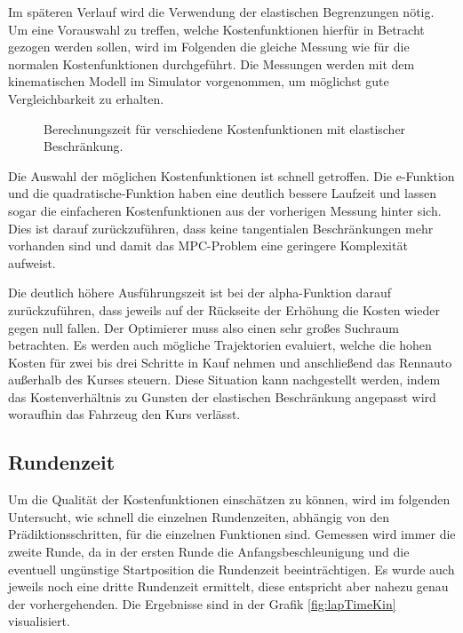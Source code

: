 \documentclass{like}
\begin{document}
\begin{figure}
	\centering
	 
	\caption{}
	\label{fig:computeCost}
\end{figure}

Im späteren Verlauf wird die Verwendung der elastischen Begrenzungen nötig. Um eine Vorauswahl zu treffen, welche Kostenfunktionen hierfür in Betracht gezogen werden sollen, wird im Folgenden die gleiche Messung wie für die normalen Kostenfunktionen durchgeführt. Die Messungen werden mit dem kinematischen Modell im Simulator vorgenommen, um möglichst gute Vergleichbarkeit zu erhalten.

\begin{figure}
	\centering
	 
	\caption{Berechnungszeit für verschiedene Kostenfunktionen mit elastischer Beschränkung.}
	\label{fig:computeCostSoftConst}
\end{figure}

Die Auswahl der möglichen Kostenfunktionen ist schnell getroffen. Die e-Funktion und die quadratische-Funktion haben eine deutlich bessere Laufzeit und lassen sogar die einfacheren Kostenfunktionen aus der vorherigen Messung hinter sich. Dies ist darauf zurückzuführen, dass keine tangentialen Beschränkungen mehr vorhanden sind und damit das \ac{MPC}-Problem eine geringere Komplexität aufweist.

Die deutlich höhere Ausführungszeit ist bei der alpha-Funktion darauf zurückzuführen, dass jeweils auf der Rückseite der Erhöhung die Kosten wieder gegen null fallen. Der Optimierer muss also einen sehr großes Suchraum betrachten. Es werden auch mögliche Trajektorien evaluiert, welche die hohen Kosten für zwei bis drei Schritte in Kauf nehmen und anschließend das Rennauto außerhalb des Kurses steuern. Diese Situation kann nachgestellt werden, indem das Kostenverhältnis zu Gunsten der elastischen Beschränkung angepasst wird woraufhin das Fahrzeug den Kurs verlässt.  

\subsection{Rundenzeit}
\label{laptime}
Um die Qualität der Kostenfunktionen einschätzen zu können, wird im folgenden Untersucht, wie schnell die einzelnen Rundenzeiten, abhängig von den Prädiktionsschritten, für die einzelnen Funktionen sind.
Gemessen wird immer die zweite Runde, da in der ersten Runde die Anfangsbeschleunigung und die eventuell ungünstige Startposition die Rundenzeit beeinträchtigen. Es wurde auch jeweils noch eine dritte Rundenzeit ermittelt, diese entspricht aber nahezu genau der vorhergehenden. Die Ergebnisse sind in der Grafik \ref{fig:lapTimeKin} visualisiert.
\end{document}
